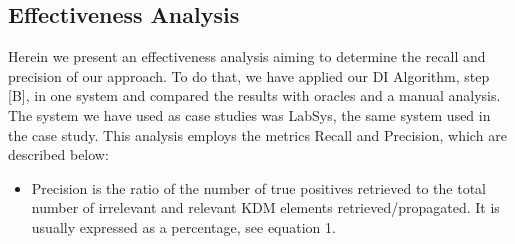 \subsection{Effectiveness Analysis}\label{hypothesis_formulation}	

Herein we present an effectiveness analysis aiming to determine the recall and precision of our approach. To do that, we have applied our DI Algorithm, step [B], in one system and compared the results with oracles and a manual analysis. The system we have used as case studies was LabSys, the same system used in the case study. This analysis employs the metrics Recall and Precision, which are described below:

\begin{itemize}
\item Precision is the ratio of the number of true positives retrieved to the total number of irrelevant and relevant KDM elements retrieved/propagated. It is usually expressed as a percentage, see equation 1.
\end{itemize}



